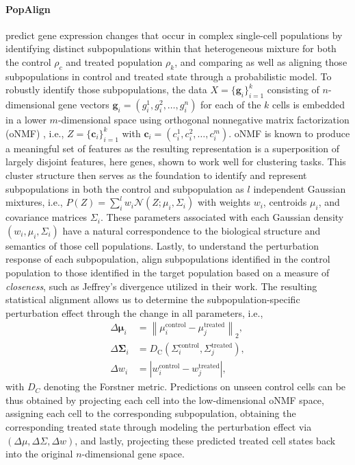 \paragraph{PopAlign}
\citet{chen2020} predict gene expression changes that occur in complex single-cell populations by identifying distinct subpopulations within that heterogeneous mixture for both the control $\rho_c$ and treated population $\rho_k$, and comparing as well as aligning those subpopulations in control and treated state through a probabilistic model.
To robustly identify those subpopulations, the data $X = \{ \mathbf{g}_i \}_{i=1}^k$ consisting of $n$-dimensional gene vectors $\mathbf{g}_i = (g_i^1, g_i^2, \dots, g_i^n)$ for each of the $k$ cells is embedded in a lower $m$-dimensional space using orthogonal nonnegative matrix factorization (oNMF) \citep{asteris2015}, i.e., $Z = \{ \mathbf{c}_i \}_{i=1}^k$ with $\mathbf{c}_i = (c_i^1, c_i^2, \dots, c_i^m)$. oNMF is known to produce a meaningful set of features as the resulting representation is a superposition of largely disjoint features, here genes, shown to work well for clustering tasks.
This cluster structure then serves as the foundation to identify and represent subpopulations in both the control and subpopulation as $l$ independent Gaussian mixtures, i.e., $P(Z) = \sum_i^l w_i \mathcal{N}(Z; \mu_i, \Sigma_i)$ with weights $w_i$, centroids $\mu_i$, and covariance matrices $\Sigma_i$.
These parameters associated with each Gaussian density $(w_i, \mu_i, \Sigma_i)$ have a natural correspondence to the biological structure and semantics of those cell populations.
Lastly, to understand the perturbation response of each subpopulation, \citet{chen2020} align subpopulations identified in the control population to those identified in the target population based on a measure of \emph{closeness}, such as Jeffrey's divergence utilized in their work. The resulting statistical alignment allows us to determine the subpopulation-specific perturbation effect through the change in all parameters, i.e.,
\begin{align*}
	\Delta \boldsymbol{\mu}_i &=\left\|\mu_i^{\text {control}}-\mu_j^{\text {treated}}\right\|_2, \\
	\Delta \boldsymbol{\Sigma}_i &=D_{\mathrm{C}}\left(\Sigma_i^{\text {control}}, \Sigma_j^{\text {treated}}\right), \\
	\Delta w_i &=\left|w_i^{\text {control}}-w_j^{\text {treated}}\right|,
\end{align*}
with $D_C$ denoting the Forstner metric. Predictions on unseen control cells can be thus obtained by projecting each cell into the low-dimensional oNMF space, assigning each cell to the corresponding subpopulation, obtaining the corresponding treated state through modeling the perturbation effect via $(\Delta \mu, \Delta \Sigma, \Delta w)$, and lastly, projecting these predicted treated cell states back into the original $n$-dimensional gene space.

